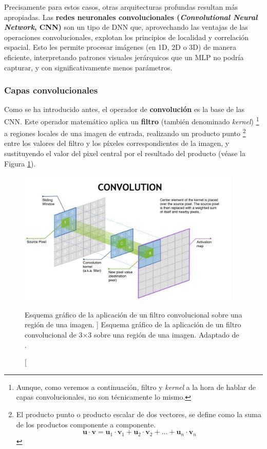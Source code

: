 Precisamente para estos casos, otras arquitecturas profundas resultan más apropiadas.
Las \textbf{redes neuronales convolucionales (\textit{Convolutional Neural Network}, \acrshort{CNN})} son un 
tipo de \acrshort{DNN} que, aprovechando las ventajas de las operaciones convolucionales, explotan los principios de localidad y correlación espacial. Esto les permite procesar imágenes (en 1D, 2D o 3D) de manera eficiente, interpretando patrones visuales jerárquicos que un \acrshort{MLP} no podría capturar, y con significativamente menos parámetros.


\subsubsection{Capas convolucionales}

Como se ha introducido antes, el operador de \textbf{convolución} es la base de las \acrshort{CNN}. Este operador 
matemático aplica un \textbf{filtro} (también denominado \textit{kernel})%
\footnote{
    Aunque, como veremos a continuación, filtro y \textit{kernel} a la hora de hablar de capas 
    convolucionales, no son técnicamente lo mismo.
} 
a regiones locales de una imagen de entrada, realizando un producto punto%
\footnote{
    El producto punto o producto escalar de dos vectores, se define como la suma de los productos componente a 
    componente. 
    $$
    \mathbf{u} \cdot \mathbf{v} = \mathbf{u}_1 \cdot \mathbf{v}_1 + \mathbf{u}_2 \cdot \mathbf{v}_2 + ... + 
    \mathbf{u}_n \cdot \mathbf{v}_n
    $$
} 
entre los valores del filtro y los píxeles correspondientes de la imagen, y sustituyendo el valor del pixel 
central por el resultado del producto (véase la Figura \ref{fig:conv_op}).

\begin{figure}[htbp]
    \centering
    \includegraphics[width=0.95\textwidth]{capitulos/cap_02/imagenes/convolution_operation.jpg}
    \caption
    [
        Esquema gráfico de la aplicación de un filtro convolucional sobre una región de una imagen.
    ]{
        Esquema gráfico de la aplicación de un filtro convolucional de 3×3 sobre una región de una imagen.
        Adaptado de \cite{nvidia2025convolutionoperation}.
    } 
    \label{fig:conv_op}
\end{figure}

